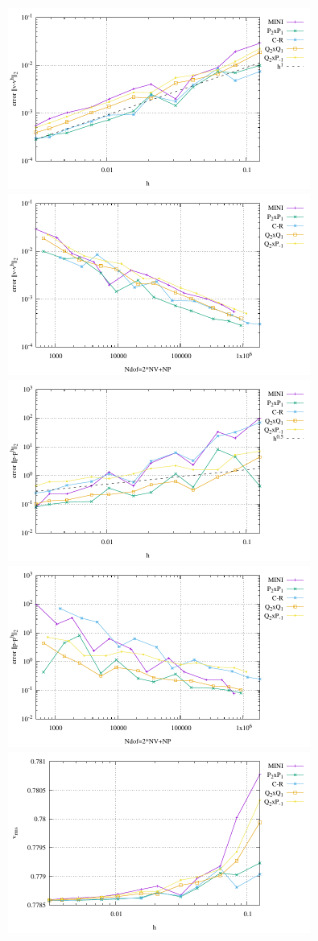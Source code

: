 \begin{center}
\includegraphics[width=8cm]{python_codes/fieldstone_112/results/exp5/errors_V.pdf}
\includegraphics[width=8cm]{python_codes/fieldstone_112/results/exp5/errors_V_ndof.pdf}\\
\includegraphics[width=8cm]{python_codes/fieldstone_112/results/exp5/errors_P.pdf}
\includegraphics[width=8cm]{python_codes/fieldstone_112/results/exp5/errors_P_ndof.pdf}\\
\includegraphics[width=8cm]{python_codes/fieldstone_112/results/exp5/vrms.pdf}

\end{center}
